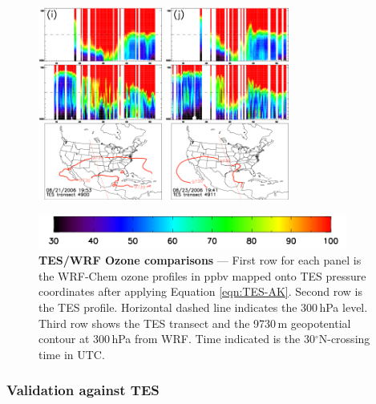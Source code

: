 \begin{figure}
\begin{center}
		\includegraphics[width=1.6in]{o3/o3_4900_ftuv}
		\includegraphics[width=1.6in]{o3/o3_4911_ftuv}
		
		\includegraphics[width=4in]{o3/o3_colorbar}
		\end{center}
	    	\caption[TES/WRF-Chem Ozone comparisons]{\textbf{TES/WRF Ozone comparisons} --- First row for each panel is the WRF-Chem
		ozone profiles in ppbv mapped onto TES pressure coordinates after applying Equation \ref{eqn:TES-AK}. Second row is the
		TES profile. Horizontal dashed line indicates the 300\,\unit{hPa} level. Third row shows the TES transect and the  9730\,\unit{m}
		geopotential contour at 300\,\unit{hPa} from WRF. Time indicated is the 30$^\circ$N-crossing time in \unit{UTC}.} \label{fig:2006/o3tes}
	\end{figure}

\subsubsection{Validation against TES}


